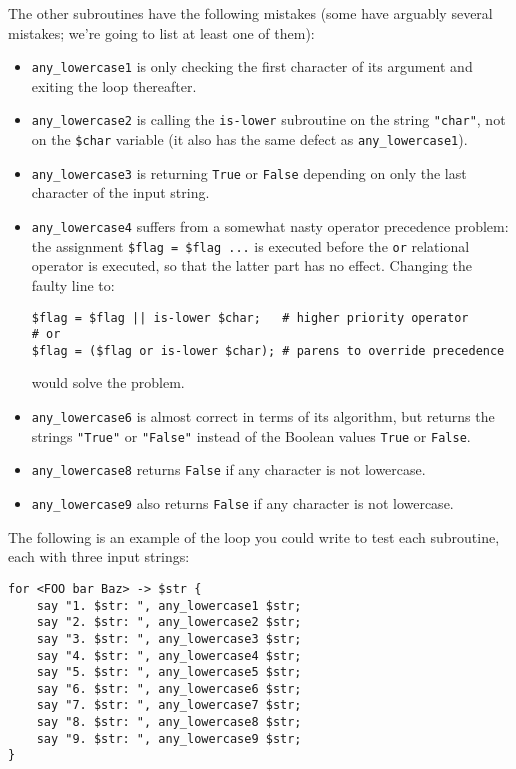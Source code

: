 The other subroutines have the following mistakes (some have 
arguably several mistakes; we're going to list at least one of 
them):
\begin{itemize} 

\item \verb'any_lowercase1' is only checking the first 
character of its argument and exiting the loop thereafter.

\item \verb'any_lowercase2' is calling the {\tt is-lower} 
subroutine on the string {\tt "char"}, not on the 
{\tt \$char} variable (it also has the same defect as 
\verb'any_lowercase1').

\item \verb'any_lowercase3' is returning {\tt True} or 
{\tt False} depending on only the last character of the 
input string.

\item \verb'any_lowercase4' suffers from a somewhat nasty 
operator precedence problem: the assignment \verb'$flag = $flag ...' 
is executed before the {\tt or} relational operator is executed, 
so that the latter part has no effect. 
Changing the faulty line to:
\begin{verbatim}
$flag = $flag || is-lower $char;   # higher priority operator
# or
$flag = ($flag or is-lower $char); # parens to override precedence
\end{verbatim}
would solve the problem.

\item \verb'any_lowercase6' is almost correct in terms of its 
algorithm, but returns the strings {\tt "True"} or 
{\tt "False"} instead of the Boolean values {\tt True} or 
{\tt False}.

\item  \verb'any_lowercase8' returns {\tt False} if any 
character is not lowercase.

\item  \verb'any_lowercase9' also returns {\tt False} if any 
character is not lowercase.

\end{itemize}

The following is an example of the loop you could write to test 
each subroutine, each with three input strings:

\begin{verbatim}
for <FOO bar Baz> -> $str {
    say "1. $str: ", any_lowercase1 $str;
    say "2. $str: ", any_lowercase2 $str;
    say "3. $str: ", any_lowercase3 $str;
    say "4. $str: ", any_lowercase4 $str;
    say "5. $str: ", any_lowercase5 $str;
    say "6. $str: ", any_lowercase6 $str;
    say "7. $str: ", any_lowercase7 $str;
    say "8. $str: ", any_lowercase8 $str;
    say "9. $str: ", any_lowercase9 $str;
}
\end{verbatim}

